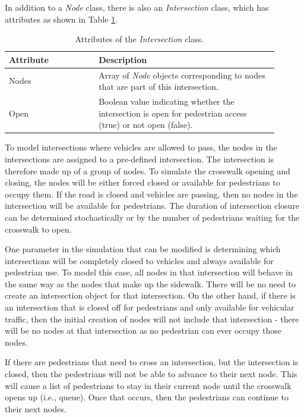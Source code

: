 \documentclass[12pt]{article}
\begin{document}
In addition to a \textit{Node} class, there is also an \textit{Intersection}
class, which has attributes as shown in Table \ref{table:intersection}.

\def\arraystretch{1.5}
\begin{table}[hb!]
  \centering
    \begin{tabular}{p{0.3\linewidth}p{0.6\linewidth}}
     \hline
     Attribute & Description \\
     \hline
     Nodes           & Array of \textit{Node} objects corresponding to nodes
                       that are part of this intersection. \\
     Open            & Boolean value indicating whether the intersection is open
                       for pedestrian access (true) or not open (false). \\
     \hline
    \end{tabular}
    \caption{Attributes of the \textit{Intersection} class.}
  \label{table:intersection}
\end{table}

To model intersections where vehicles are allowed to pass, the nodes in the
intersections are assigned to a pre-defined intersection. The intersection
is therefore made up of a group of nodes. To simulate the crosswalk opening and
closing, the nodes will be either forced closed or available for pedestrians to
occupy them. If the road is closed and vehicles are passing, then no nodes in
the intersection will be available for pedestrians. The duration of
intersection closure can be determined stochastically or by the number of
pedestrians waiting for the crosswalk to open.

One parameter in the simulation that can be modified is determining which
intersections will be completely closed to vehicles and always available for
pedestrian use. To model this case, all nodes in that intersection will behave
in the same way as the nodes that make up the sidewalk. There will be no need to
create an intersection object for that intersection. On the other hand, if there
is an intersection that is closed off for pedestrians and only available for
vehicular traffic, then the initial creation of nodes will not include that
intersection - there will be no nodes at that intersection as no pedestrian can
ever occupy those nodes.

If there are pedestrians that need to cross an intersection, but the
intersection is closed, then the pedestrians will not be able to advance to
their next node. This will cause a list of pedestrians to stay in their
current node until the crosswalk opens up (i.e., queue). Once that occurs, then
the pedestrians can continue to their next nodes.
\end{document}
